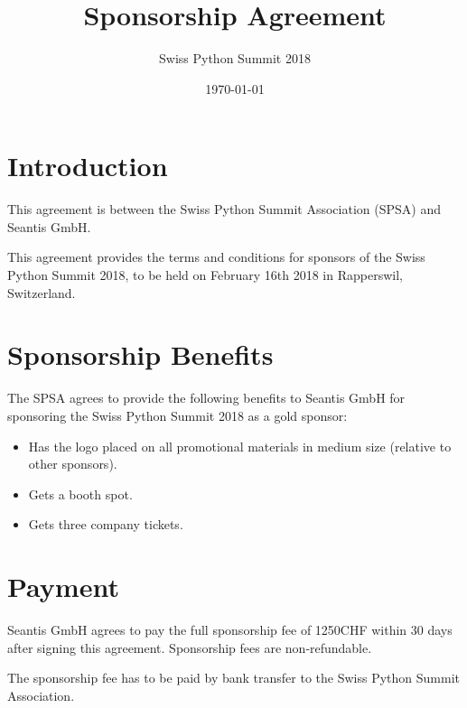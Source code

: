 \documentclass[11pt,enlargefirstpage=true,headlines=4]{scrartcl}
\title{Sponsorship Agreement}
\subtitle{Swiss Python Summit 2018}
\date{\today} %
\begin{document}
    \maketitle

    \section{Introduction}

    This agreement is between the Swiss Python Summit Association (SPSA) and
    Seantis GmbH.

    This agreement provides the terms and conditions for sponsors of the Swiss
    Python Summit 2018, to be held on February 16th 2018 in Rapperswil,
    Switzerland.

    \section{Sponsorship Benefits}

    The SPSA agrees to provide the following benefits to Seantis GmbH for sponsoring
    the Swiss Python Summit 2018 as a gold sponsor:

    \begin{itemize}
        \item Has the logo placed on all promotional materials in medium size (relative to other sponsors).
        \item Gets a booth spot.
        \item Gets three company tickets.
    \end{itemize}

    \section{Payment}

    Seantis GmbH agrees to pay the full sponsorship fee of 1250CHF within 30 days
    after signing this agreement. Sponsorship fees are non‐refundable.

    The sponsorship fee has to be paid by bank transfer to the Swiss Python
    Summit Association.

    \quad
\end{document}
